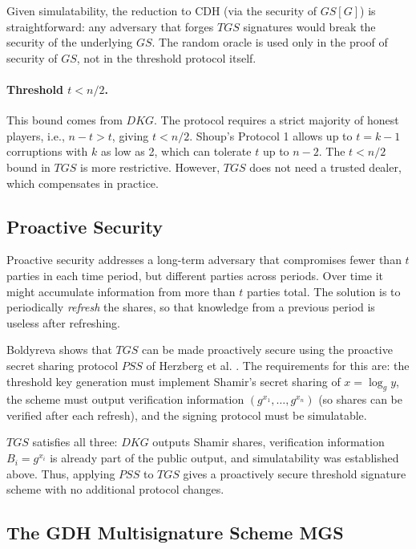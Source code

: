 Given simulatability, the reduction to CDH (via the security of $GS[G]$) is
straightforward: any adversary that forges $TGS$ signatures would break the security of
the underlying $GS$. The random oracle is used only in the proof of security of $GS$,
not in the threshold protocol itself.

\paragraph{Threshold $t < n/2$.} This bound comes from $DKG$. The protocol requires a
strict majority of honest players, i.e., $n - t > t$, giving $t < n/2$. Shoup's Protocol
1 allows up to $t = k - 1$ corruptions with $k$ as low as 2, which can tolerate $t$ up
to $n - 2$. The $t < n/2$ bound in $TGS$ is more restrictive. However, $TGS$ does not
need a trusted dealer, which compensates in practice.

\subsection{Proactive Security}

Proactive security addresses a long-term adversary that compromises fewer than $t$
parties in each time period, but different parties across periods. Over time it might
accumulate information from more than $t$ parties total. The solution is to periodically
\emph{refresh} the shares, so that knowledge from a previous period is useless after
refreshing.

Boldyreva shows that $TGS$ can be made proactively secure using the proactive secret
sharing protocol $PSS$ of Herzberg et al. \cite{HJKY}. The requirements for this are:
the threshold key generation must implement Shamir's secret sharing of $x = \log_g y$,
the scheme must output verification information $(g^{x_1}, \ldots, g^{x_n})$ (so shares
can be verified after each refresh), and the signing protocol must be simulatable.

$TGS$ satisfies all three: $DKG$ outputs Shamir shares, verification information $B_i =
g^{x_i}$ is already part of the public output, and simulatability was established above.
Thus, applying $PSS$ to $TGS$ gives a proactively secure threshold signature scheme with
no additional protocol changes.

\subsection{The GDH Multisignature Scheme MGS}

